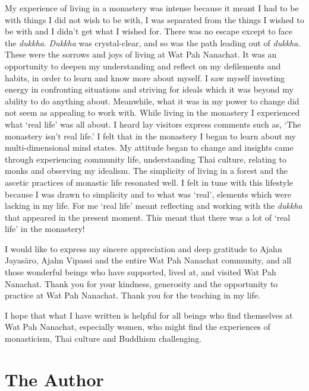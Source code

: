My experience of living in a monastery was intense because it meant I
had to be with things I did not wish to be with, I was separated from
the things I wished to be with and I didn't get what I wished for. There
was no escape except to face the \emph{dukkha}. \emph{Dukkha} was
crystal-clear, and so was the path leading out of \emph{dukkha}. These
were the sorrows and joys of living at Wat Pah Nanachat. It was an
opportunity to deepen my understanding and reflect on my defilements and
habits, in order to learn and know more about myself. I saw myself
investing energy in confronting situations and striving for ideals which
it was beyond my ability to do anything about. Meanwhile, what it was in
my power to change did not seem as appealing to work with. While living
in the monastery I experienced what `real life' was all about. I heard
lay visitors express comments such as, `The monastery isn't real life.'
I felt that in the monastery I began to learn about my multi-dimensional
mind states. My attitude began to change and insights came through
experiencing community life, understanding Thai culture, relating to
monks and observing my idealism. The simplicity of living in a forest
and the ascetic practices of monastic life resonated well. I felt in
tune with this lifestyle because I was drawn to simplicity and to what
was `real', elements which were lacking in my life. For me `real life'
meant reflecting and working with the \emph{dukkha} that appeared in the
present moment. This meant that there was a lot of `real life' in the
monastery! 

I would like to express my sincere appreciation and deep gratitude to
Ajahn Jayasāro, Ajahn Vipassi and the entire Wat Pah Nanachat community, 
and all those wonderful beings who have supported, lived at, and visited
Wat Pah Nanachat. Thank you for your kindness, generosity and the
opportunity to practice at Wat Pah Nanachat. Thank you for the teaching
in my life. 

I hope that what I have written is helpful for all beings who find
themselves at Wat Pah Nanachat, especially women, who might find the
experiences of monasticism, Thai culture and Buddhism challenging. 

\clearpage

\section{The Author}

